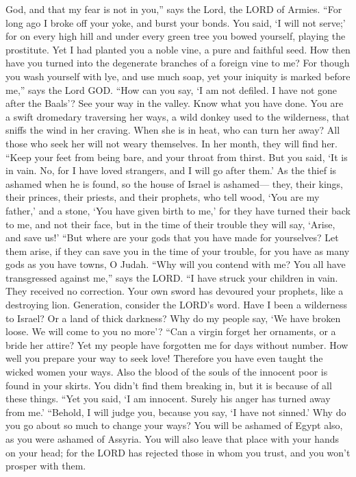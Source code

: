 God, and that my fear is not in you,'' says the Lord, the LORD of
Armies.  ``For long ago I broke off your yoke, and burst
your bonds. You said, `I will not serve;' for on every high hill and
under every green tree you bowed yourself, playing the prostitute.
 Yet I had planted you a noble vine, a pure and faithful
seed. How then have you turned into the degenerate branches of a foreign
vine to me?  For though you wash yourself with lye, and
use much soap, yet your iniquity is marked before me,'' says the Lord
GOD.  ``How can you say, `I am not defiled. I have not
gone after the Baals'? See your way in the valley. Know what you have
done. You are a swift dromedary traversing her ways,  a
wild donkey used to the wilderness, that sniffs the wind in her craving.
When she is in heat, who can turn her away? All those who seek her will
not weary themselves. In her month, they will find her. 
``Keep your feet from being bare, and your throat from thirst. But you
said, `It is in vain. No, for I have loved strangers, and I will go
after them.'  As the thief is ashamed when he is found,
so the house of Israel is ashamed--- they, their kings, their princes,
their priests, and their prophets,  who tell wood, `You
are my father,' and a stone, `You have given birth to me,' for they have
turned their back to me, and not their face, but in the time of their
trouble they will say, `Arise, and save us!'  ``But where
are your gods that you have made for yourselves? Let them arise, if they
can save you in the time of your trouble, for you have as many gods as
you have towns, O Judah.  ``Why will you contend with me?
You all have transgressed against me,'' says the LORD. 
``I have struck your children in vain. They received no correction. Your
own sword has devoured your prophets, like a destroying lion.
 Generation, consider the LORD's word. Have I been a
wilderness to Israel? Or a land of thick darkness? Why do my people say,
`We have broken loose. We will come to you no more'? 
``Can a virgin forget her ornaments, or a bride her attire? Yet my
people have forgotten me for days without number.  How
well you prepare your way to seek love! Therefore you have even taught
the wicked women your ways.  Also the blood of the souls
of the innocent poor is found in your skirts. You didn't find them
breaking in, but it is because of all these things. 
``Yet you said, `I am innocent. Surely his anger has turned away from
me.' ``Behold, I will judge you, because you say, `I have not sinned.'
 Why do you go about so much to change your ways? You
will be ashamed of Egypt also, as you were ashamed of Assyria.
 You will also leave that place with your hands on your
head; for the LORD has rejected those in whom you trust, and you won't
prosper with them.

